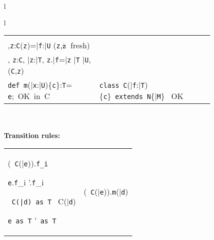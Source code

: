 \begin{figure*}
\begin{tabular}{l}
{\begin{tabular}{l}
\begin{tabular}{p{}p{}}
	&
\infrule[T-New]
	{\Gamma \vdash \bar{\tt e}:\bar{\tt T} \andalso \vdash \klass({\tt C}) \\ 
	  \Gamma,{\tt z}:{\tt C}\vdash \fields({\tt z})=\bar{\tt f}:\bar{\tt U}  \andalso \mbox{({\tt z},$\bar{\tt z}$\ fresh)}\\
	  \Gamma, {\tt z}:{\tt C}, \bar{\tt z}:\bar{\tt T}, {\tt z}.\bar{\tt f}=\bar{\tt z} 
	  \vdash \bar{\tt T} \subtype \bar{\tt U}, \inv({\tt C},{\tt z})}
	{\Gamma \vdash \new\ {\tt C}(\bar{\tt e}): {\tt C}\{\bar{\tt z}:\bar{\tt T};\,\new\ {\tt C}(\bar{\tt z})=\self, \inv({\tt C},\self)\}}
\\[-12pt]
\infrule[Method OK]
	{\this:{\tt C}\vdash {\tt c}:{\tt o} \andalso \this:{\tt C},\bar{\tt x}:\bar{\tt U},{\tt c} \vdash {\tt T} \ \type, \bar{\tt U} \ \type, 
	  {\tt e}:{\tt S}, {\tt S} \subtype {\tt T}}
	{{\tt def}\ {\tt m}(\bar{\tt x}:\bar{\tt U})\{{\tt c}\}:{\tt T}= {\tt e};\ \mbox{OK in}\ C}
	&
\infrule[Class OK]
	{\bar{\tt M}\ \mbox{OK in}\ {\tt C}
        \andalso
        \this:{\tt C} \vdash {\tt c}:{\tt o}
        \andalso
        \this:{\tt C},{\tt c} \vdash \bar{\tt T}\ \type, {\tt N}\ \type}
	{\mbox{\tt class}\ {\tt C}(\bar{\tt f}:\bar{\tt T})\{{\tt c}\}\ 
	  \mbox{\tt extends}\ {\tt N}\{\bar{\tt M}\} \ \mbox{OK}}
\end{tabular}
\end{tabular}}\\[-12pt]
\quad\\
{\bf Transition rules:}\\[-12pt]
{\tabcolsep=0pt
\begin{tabular}{p{}@{\quad}p{}}
\typicallabel{RC-Field}
\infrule[\RField]
	{\tt x:C \vdash \fields(\tt x)=\bar{\tt f}:\bar{\tt T}}
	{(\new\ {\tt C}(\bar{\tt e})).{\tt f_i} \derives {\tt e_i}}

\infrule[\RCField]%
	{{\tt e} \derives {{\tt e}}'}
	{{\tt e}.{\tt f}_i \derives {{\tt e}}'.{\tt f}_i}

\infrule[\RCast]%
	{\vdash {\tt C}\{\self==\new\ {\tt C}(\bar{\tt d})\} \subtype {\tt T}}
	{{\tt \new\ C(\bar{\tt d})~as~T} \derives \new\ C(\bar{\tt d})}

\infrule[\RCCast]%
	{{\tt e} \derives {{\tt e}}'}
	{{\tt e~as~T} \derives {\tt e}'~{\tt as~T}}
	&
	\typicallabel{RC-Invk-Recv}
	\infrule[\RInvk]
		{{\tt x:C}\vdash {\tt x}\ \has\ {\tt m}(\bar{\tt x}:\bar{\tt T}){\tt \{c\}:T=e}}
		{(\new\ {\tt C}(\bar{\tt e})).{\tt m}(\bar{\tt d}) \derives {\tt e[\new\ {\tt C}(\bar{\tt e}),\bar{\tt d}/\this,\bar{\tt x}]}}


\end{tabular}}
\end{tabular}
\end{figure*}
